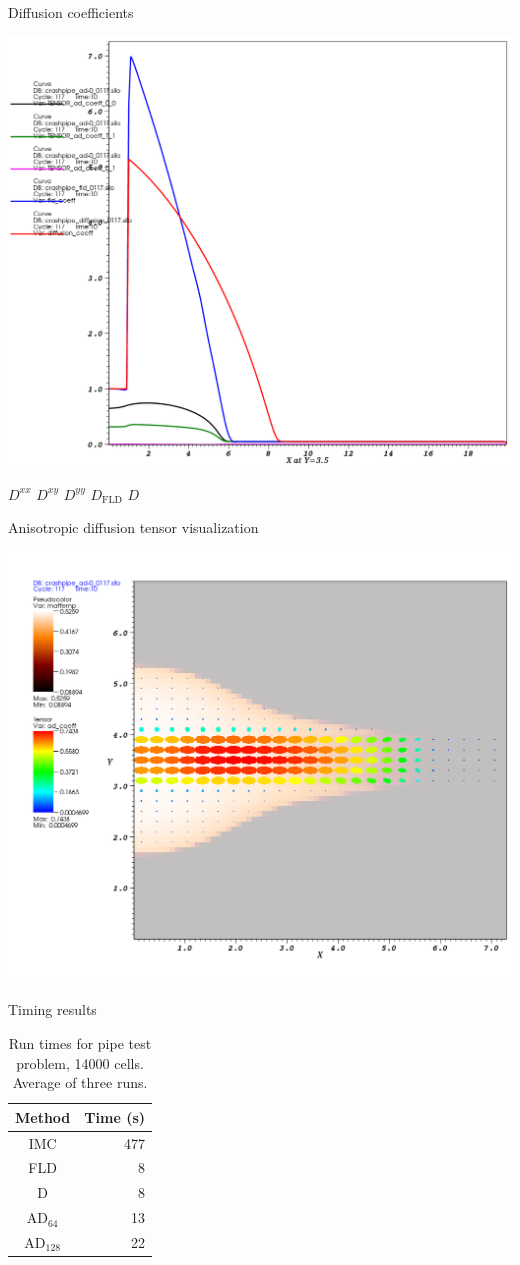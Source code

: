 \documentclass{beamer}
\begin{document}
\begin{frame}{Diffusion coefficients}
\begin{center}
  \includegraphics[width=.60\textwidth]{crashpipe2/dcoeff_t10}

\textcolor[rgb]{0,0,0}{$D^{xx}$}\quad
\textcolor[rgb]{1,0,.5}{$D^{xy}$}\quad
\textcolor[rgb]{0.1,0.9,0.1}{$D^{yy}$}\quad
\textcolor[rgb]{0,0,1}{$D_\text{FLD}$}\quad
  \textcolor[rgb]{1,0,0}{$D$}
\end{center}
\end{frame}
\begin{frame}{Anisotropic diffusion tensor visualization}
\begin{center}
  \includegraphics[width=.75\textwidth]{crashpipe2/adcoeff_t10}
\end{center}
\end{frame}
\begin{frame}{Timing results}
  \begin{table}[htb]
    \centering
    \begin{tabular}{cr}
      Method & Time (s) \\ \hline
      IMC & 477 \\
      FLD & 8 \\
      D   & 8 \\
      AD$_{64}$ & 13 \\
      AD$_{128}$ & 22
    \end{tabular}
    \caption{Run times for pipe test problem, 14000 cells. Average of three
    runs.}
    \label{tab:pipeTiming}
  \end{table}
\end{frame}
\end{document}
